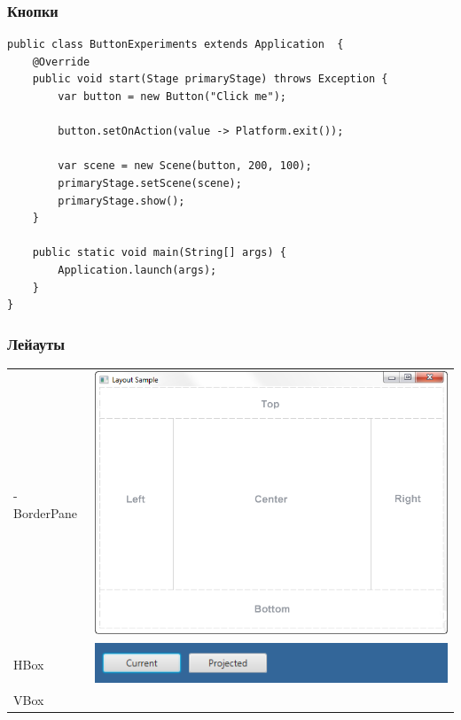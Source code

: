 \documentclass[xetex,mathserif,serif]{beamer}
\begin{document}
	\begin{frame}[fragile]
		\frametitle{Кнопки}
		\begin{verbatim}
public class ButtonExperiments extends Application  {
    @Override
    public void start(Stage primaryStage) throws Exception {
        var button = new Button("Click me");

        button.setOnAction(value -> Platform.exit());

        var scene = new Scene(button, 200, 100);
        primaryStage.setScene(scene);
        primaryStage.show();
    }

    public static void main(String[] args) {
        Application.launch(args);
    }
}
		\end{verbatim}
	\end{frame}

	\begin{frame}
		\frametitle{Лейауты}
			\begin{tabu} {| X[1 l m] | X[1 c m] |}
				\tabucline-
				\everyrow{\tabucline-}
				BorderPane               & \includegraphics[height=0.2\textheight]{borderLayout.png}           \\
				HBox                     & \includegraphics[height=0.04\textheight]{hbox.png}                  \\
				VBox                     &                                                                     \\

\end{tabu}
\end{frame}
\end{document}
